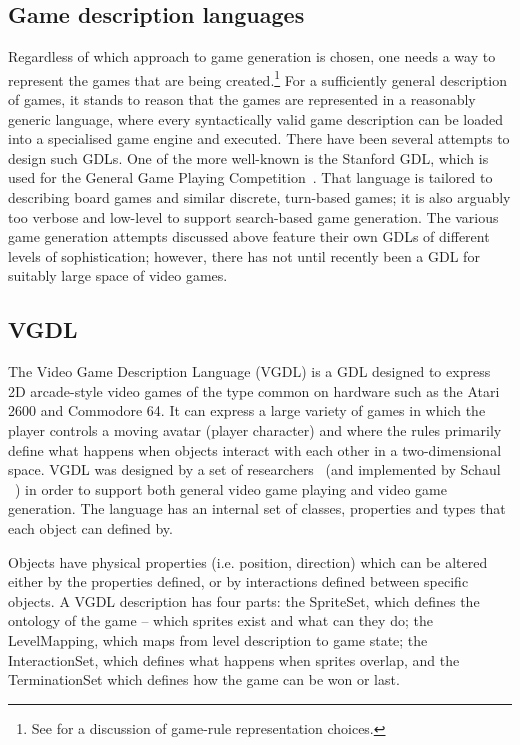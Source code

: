 \documentclass{llncs}
\begin{document}
\subsection{Game description languages}

Regardless of which approach to game generation is chosen, one needs a way to represent the games that are being created.\footnote{See \cite{pcgbook:ch6} for a discussion of game-rule representation choices.} For a sufficiently general description of games, it stands to reason that the games are represented in a reasonably generic language, where every syntactically valid game description can be loaded into a specialised game engine and executed. There have been several attempts to design such GDLs. One of the more well-known is the Stanford GDL, which is used for the General Game Playing Competition~\cite{genesereth2005general}. That language is tailored to describing board games and similar discrete, turn-based games; it is also arguably too verbose and low-level to support search-based game generation. The various game generation attempts discussed above feature their own GDLs of different levels of sophistication; however, there has not until recently been a GDL for suitably large space of video games.

\subsection{VGDL}
The Video Game Description Language (VGDL) is a GDL designed to express 2D arcade-style video games of the type common on hardware such as the Atari 2600 and Commodore 64. It can express a large variety of games in which the player controls a moving avatar (player character) and where the rules primarily define what happens when objects interact with each other in a two-dimensional space. VGDL was designed by a set of researchers~\cite{levine2013general,ebner2013towards} (and implemented by Schaul ~\cite{schaul2013video}) in order to support both general video game playing and video game generation.
The language has an internal set of classes, properties and types that each object can defined by.

Objects have physical properties (i.e. position, direction) which can be altered either by the properties defined, or by interactions defined between specific objects. A VGDL description has four parts: the SpriteSet, which defines the ontology of the game -- which sprites exist and what can they do; the LevelMapping, which maps from level description to game state; the InteractionSet, which defines what happens when sprites overlap, and the TerminationSet which defines how the game can be won or last.
\end{document}

